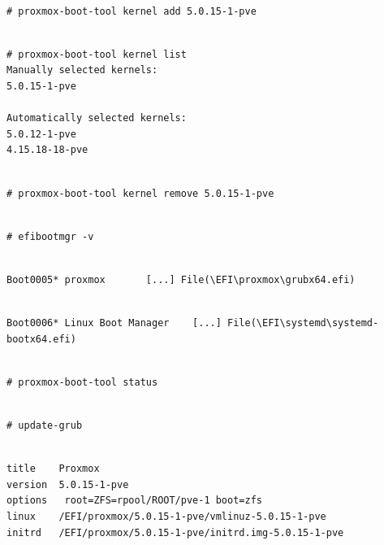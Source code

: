 \begin{lstlisting}

# proxmox-boot-tool kernel add 5.0.15-1-pve

\end{lstlisting}

\begin{lstlisting}

# proxmox-boot-tool kernel list
Manually selected kernels:
5.0.15-1-pve

Automatically selected kernels:
5.0.12-1-pve
4.15.18-18-pve

\end{lstlisting}

\begin{lstlisting}

# proxmox-boot-tool kernel remove 5.0.15-1-pve

\end{lstlisting}

\begin{lstlisting}

# efibootmgr -v

\end{lstlisting}

\begin{lstlisting}

Boot0005* proxmox       [...] File(\EFI\proxmox\grubx64.efi)

\end{lstlisting}

\begin{lstlisting}

Boot0006* Linux Boot Manager    [...] File(\EFI\systemd\systemd-bootx64.efi)

\end{lstlisting}

\begin{lstlisting}

# proxmox-boot-tool status

\end{lstlisting}

\begin{lstlisting}

# update-grub

\end{lstlisting}

\begin{lstlisting}

title    Proxmox
version  5.0.15-1-pve
options   root=ZFS=rpool/ROOT/pve-1 boot=zfs
linux    /EFI/proxmox/5.0.15-1-pve/vmlinuz-5.0.15-1-pve
initrd   /EFI/proxmox/5.0.15-1-pve/initrd.img-5.0.15-1-pve

\end{lstlisting}

